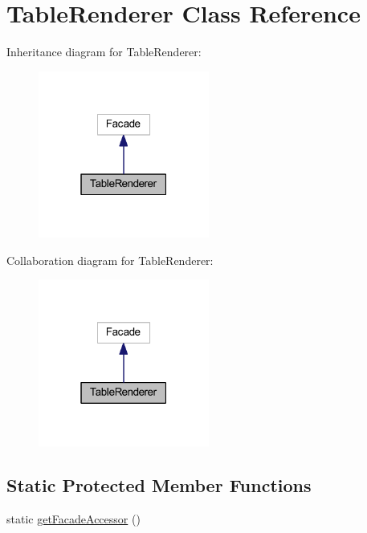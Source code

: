 \hypertarget{classhamburgscleanest_1_1_data_tables_1_1_facades_1_1_table_renderer}{}\section{Table\+Renderer Class Reference}
\label{classhamburgscleanest_1_1_data_tables_1_1_facades_1_1_table_renderer}


Inheritance diagram for Table\+Renderer\+:
\nopagebreak
\begin{figure}[H]
\begin{center}
\leavevmode
\includegraphics[width=159pt]{classhamburgscleanest_1_1_data_tables_1_1_facades_1_1_table_renderer__inherit__graph}
\end{center}
\end{figure}


Collaboration diagram for Table\+Renderer\+:
\nopagebreak
\begin{figure}[H]
\begin{center}
\leavevmode
\includegraphics[width=159pt]{classhamburgscleanest_1_1_data_tables_1_1_facades_1_1_table_renderer__coll__graph}
\end{center}
\end{figure}
\subsection*{Static Protected Member Functions}
\begin{DoxyCompactItemize}
\item 
static \hyperlink{classhamburgscleanest_1_1_data_tables_1_1_facades_1_1_table_renderer_a19a808201f41f32f71a0532cb49b450f}{get\+Facade\+Accessor} ()
\end{DoxyCompactItemize}


